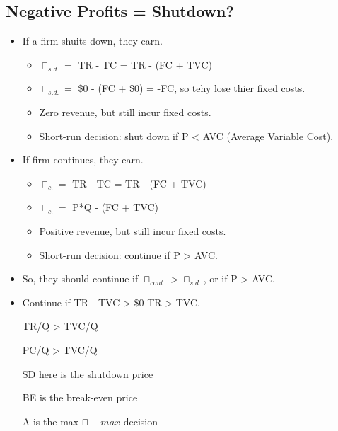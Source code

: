 \documentclass{article}
\begin{document}
\subsection{Negative Profits = Shutdown?}
\begin{itemize}
  \item If a firm shuits down, they earn.
    \begin{itemize}
      \item $\sqcap_{s.d.}^{} = $ TR - TC = TR - (FC + TVC)
      \item $\sqcap_{s.d.}^{} = $ \$0 - (FC + \$0) = -FC, so tehy lose thier fixed costs.
      \item Zero revenue, but still incur fixed costs.
      \item Short-run decision: shut down if P < AVC (Average Variable Cost).
    \end{itemize}
  \item If firm continues, they earn.
    \begin{itemize}
      \item $\sqcap_{c.}^{} = $ TR - TC = TR - (FC + TVC)
      \item $\sqcap_{c.}^{} = $ P*Q - (FC + TVC)
      \item Positive revenue, but still incur fixed costs.
      \item Short-run decision: continue if P > AVC.
    \end{itemize}
  \item So, they should continue if $\sqcap_{cont.} > \sqcap_{s.d.}$, or if P > AVC.
  \item Continue if TR - TVC > \$0 \rightarrow{} TR > TVC.

    TR/Q > TVC/Q

    PC/Q > TVC/Q

    SD here is the shutdown price

    BE is the break-even price

    A is the max $\sqcap-max$ decision
\end{itemize}
\end{document}
